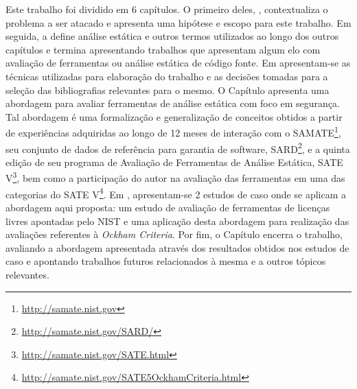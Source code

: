 Este trabalho foi dividido em 6 capítulos. O primeiro deles, , contextualiza o problema a ser atacado e apresenta uma hipótese e escopo para este trabalho. Em seguida, a  define análise estática e outros termos utilizados ao longo dos outros capítulos e termina apresentando trabalhos que apresentam algum elo com avaliação de ferramentas ou análise estática de código fonte. Em  apresentam-se as técnicas utilizadas para elaboração do trabalho e as decisões tomadas para a seleção das bibliografias relevantes para o mesmo. O Capítulo  apresenta uma abordagem para avaliar ferramentas de análise estática com foco em segurança. Tal abordagem é uma formalização e generalização de conceitos obtidos  a partir de experiências adquiridas ao longo de 12 meses de interação com o SAMATE\footnote{\url{http://samate.nist.gov}}, seu conjunto de dados de referência para garantia de software, SARD\footnote{\url{http://samate.nist.gov/SARD/}}, e a quinta edição de seu programa de Avaliação de Ferramentas de Análise Estática, SATE V\footnote{\url{http://samate.nist.gov/SATE.html}}, bem como a participação do autor na avaliação das ferramentas em uma das categorias do SATE V\footnote{\url{http://samate.nist.gov/SATE5OckhamCriteria.html}}. Em , apresentam-se 2 estudos de caso onde se aplicam a abordagem aqui proposta: um estudo de avaliação de ferramentas de licenças livres apontadas pelo NIST e uma aplicação desta abordagem para realização das avaliações referentes à \textit{Ockham Criteria}. Por fim, o Capítulo  encerra o trabalho, avaliando a abordagem apresentada através dos resultados obtidos nos estudos de caso e apontando trabalhos futuros relacionados à mesma e a outros tópicos relevantes.
